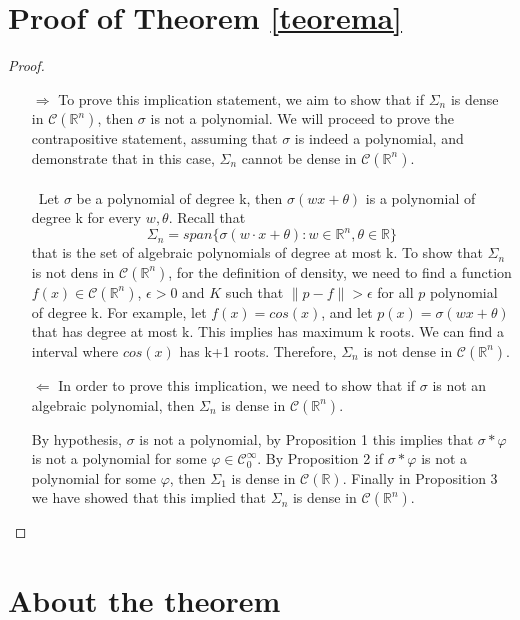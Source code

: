 \documentclass[../main.tex]{subfiles}
\begin{document}
\section{Proof of Theorem \ref{teorema}}
	\begin{proof}~ %

	\begin{enumerate}
		\item[$\Rightarrow$] 
		To prove this implication statement, we aim to show that if $\Sigma_n$ is dense in $\mathcal{C}(\mathbb{R}^n)$, then $\sigma$ is not a polynomial.
		 We will proceed to prove the contrapositive statement, assuming that $\sigma$ is indeed a polynomial, and demonstrate that in this case, $\Sigma_n$ cannot be dense in $\mathcal{C}(\mathbb{R}^n)$. \\ \\ Let $\sigma$ be a polynomial of degree k, then $\sigma(wx+\theta)$ is a polynomial  of degree k for every $w,\theta$. Recall that $$ \Sigma_n = span\{\sigma(w\cdot x + \theta) : w\in \mathbb{R}^n, \theta \in \mathbb{R} \}$$  that is the set of algebraic polynomials of degree at most k. To show that $\Sigma_n$ is not dens in $\mathcal{C}(\mathbb{R}^n)$, for the definition of density, we need to find a function $f(x)\in \mathcal{C}(\mathbb{R}^n)$, $\epsilon > 0$ and $K$ such that  $\| p-f \| > \epsilon$ for all $p$ polynomial of degree k. For example, let $f(x)=cos(x)$, and let $p(x)= \sigma(wx+\theta)$ that has degree at most k. This implies has maximum k roots. We can find a interval where $cos(x)$ has k+1 roots. Therefore, $\Sigma_n$ is not dense in $\mathcal{C}(\mathbb{R}^n)$. 

		\item[$\Leftarrow$]  In order to prove this implication, we need to show that if $\sigma$ is not an algebraic polynomial, then $\Sigma_n$ is dense in $\mathcal{C}(\mathbb{R}^n)$.
		
		
		 By hypothesis, $\sigma$ is not a polynomial, by Proposition 1 this implies that $\sigma \ast \varphi$ is not a polynomial for some $\varphi \in \mathcal{C}_0^\infty$. By Proposition 2 if $\sigma \ast \varphi$ is not a polynomial for some $\varphi$, then $\Sigma_1$ is dense in $\mathcal{C}(\mathbb{R})$. Finally in Proposition 3 we have showed that this implied that $\Sigma_n$ is dense in $\mathcal{C}(\mathbb{R}^n).$
		 
	\end{enumerate}
\end{proof}


\section{About the theorem}
\end{document}
